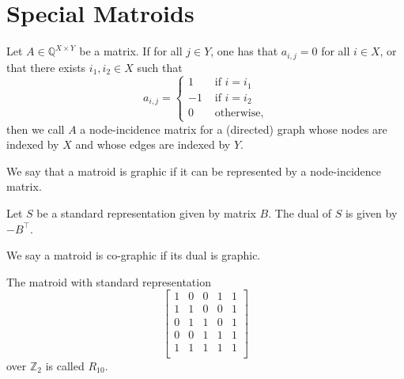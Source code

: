 \chapter{Special Matroids}

\begin{definition}
    \label{Matrix.IsGraphic}
    \leanok
    Let $A \in \mathbb{Q}^{X \times Y}$ be a matrix. If for all $j \in Y$, one has that $a_{i,j} = 0$ for all $i \in X$, or that there exists $i_1,i_2 \in X$ such that
    \[
    a_{i,j} = \begin{cases}
        1 & \text{ if $i = i_1$} \\
        -1 & \text{ if $i = i_2$} \\
        0 & \text{ otherwise},
    \end{cases}
    \]
    then we call $A$ a node-incidence matrix for a (directed) graph whose nodes are indexed by $X$ and whose edges are indexed by $Y$.
\end{definition}

\begin{definition}
    \label{Matroid.IsGraphic}
    \leanok
    We say that a matroid is graphic if it can be represented by a node-incidence matrix.
\end{definition}

\begin{definition}
    \label{StandardRepr.dual}
    \leanok
    Let $S$ be a standard representation given by matrix $B$. The dual of $S$ is given by $-B^\intercal$.
\end{definition}

\begin{definition}
    \label{Matroid.IsCographic}
    \leanok
    We say a matroid is co-graphic if its dual is graphic.
\end{definition}

\begin{definition}
    \label{matroidR10}
    \leanok
    The matroid with standard representation
        \[\begin{bmatrix}
            1 & 0 & 0 & 1 & 1 \\
            1 & 1 & 0 & 0 & 1 \\
            0 & 1 & 1 & 0 & 1 \\
            0 & 0 & 1 & 1 & 1 \\
            1 & 1 & 1 & 1 & 1 \\
        \end{bmatrix}\]
        over $\mathbb{Z}_2$ is called $R_{10}.$
    \end{definition}


